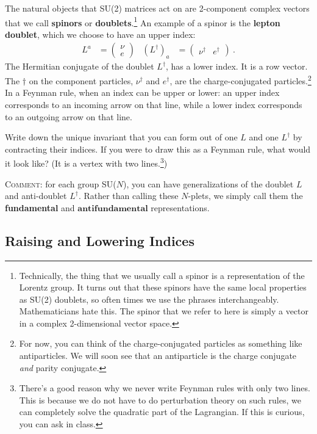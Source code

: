 \documentclass[12pt]{article}
\numberwithin{equation}{section}    %
\begin{document}
The natural objects that SU(2) matrices act on are 2-component complex vectors that we call \textbf{spinors} or \textbf{doublets}.\footnote{Technically, the thing that we usually call a spinor is a representation of the Lorentz group. It turns out that these spinors have the same local properties as SU(2) doublets, so often times we use the phrases interchangeably. Mathematicians hate this. The spinor that we refer to here is simply a vector in a complex 2-dimensional vector space.} An example of a spinor is the \textbf{lepton doublet}, which we choose to have an upper index:
\begin{align}
	L^a &= \begin{pmatrix}
		\nu \\ e
	\end{pmatrix} 
	&
	(L^\dag)_a &= \begin{pmatrix}
		\nu^\dag & e^\dag
	\end{pmatrix} 
	\ .
\end{align}
The Hermitian conjugate of the doublet $L^\dag$, has a lower index. It is a row vector. The $\dag$ on the component particles, $\nu^\dag$ and $e^\dag$, are  the charge-conjugated particles.\footnote{For now, you can think of the charge-conjugated particles as something like antiparticles. We will soon see that an antiparticle is the charge conjugate \emph{and} parity conjugate.} In a Feynman rule, when an index can be upper or lower: an upper index corresponds to an incoming arrow on that line, while a lower index corresponds to an outgoing arrow on that line.

Write down the unique invariant that you can form out of one $L$ and one $L^\dag$ by contracting their indices. If you were to draw this as a Feynman rule, what would it look like? (It is a vertex with two lines.\footnote{There's a good reason why we never write Feynman rules with only two lines. This is because we do not have to do perturbation theory on such rules, we can completely solve the quadratic part of the Lagrangian. If this is curious, you can ask in class.})

\textsc{Comment:} for each group SU($N$), you can have generalizations of the doublet $L$ and anti-doublet $L^\dag$. Rather than calling these $N$-plets, we simply call them the \textbf{fundamental} and $\textbf{antifundamental}$ representations.

\subsection{Raising and Lowering Indices}
\end{document}
